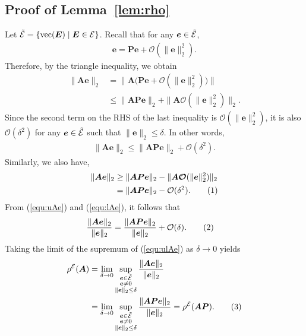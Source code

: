 \documentclass{article}
\def\E{{\cal E}}
\newcommand{\norm}[1]{\|#1\|} %
\newcommand\numberthis{\addtocounter{equation}{1}\tag{\theequation}}
\DeclareMathOperator*{\vect}{vec}
\begin{document}
\subsection{Proof of Lemma~\ref{lem:rho}}
Let $\tilde{\E} = \{ \vect(\bm E) \mid \bm E \in \E \}$.
Recall that for any $\bm e \in \tilde{\E}$,
\begin{align*}
    \bm e = \bm P \bm e + \bm{\mathcal{O}}(\norm{\bm e}_2^2) .
\end{align*}
Therefore, by the triangle inequality, we obtain
\begin{align*}
    \norm{\bm A \bm e}_2 &= \norm{\bm A \bigl(\bm P \bm e + \bm{\mathcal{O}}(\norm{\bm e}_2^2) \bigr)} \\
    &\leq \norm{\bm A \bm P \bm e}_2 + \norm{\bm A \bm{\mathcal{O}}(\norm{\bm e}_2^2)}_2 .
\end{align*}
Since the second term on the RHS of the last inequality is $\mathcal{O}(\norm{\bm e}_2^2)$, it is also $\mathcal{O}(\delta^2)$ for any $\bm e \in \tilde{\E}$ such that $\norm{\bm e}_2 \leq \delta$. In other words,
\begin{align} \label{equ:uAe}
    \norm{\bm A \bm e}_2 \leq \norm{\bm A \bm P \bm e}_2 + \mathcal{O}(\delta^2) .
\end{align}
Similarly, we also have,
\begin{align*} 
    \norm{\bm A \bm e}_2 &\geq \norm{\bm A \bm P \bm e}_2 - \norm{\bm A \bm{\mathcal{O}}(\norm{\bm e}_2^2)}_2 \\
    &= \norm{\bm A \bm P \bm e}_2 - \mathcal{O}(\delta^2) . \numberthis \label{equ:lAe}
\end{align*}
From (\ref{equ:uAe}) and (\ref{equ:lAe}), it follows that
\begin{align*} 
    \frac{\norm{\bm A \bm e}_2}{\norm{\bm e}_2} &= \frac{\norm{\bm A \bm P \bm e}_2}{\norm{\bm e}_2} + \mathcal{O}(\delta) . \numberthis \label{equ:ulAe}
\end{align*}
Taking the limit of the supremum of (\ref{equ:ulAe}) as $\delta \to 0$ yields
\begin{align*}
    \rho^\E(\bm A) &= \lim_{\delta \to 0} \sup_{\substack{\bm e \in \tilde{\E} \\ \bm e \neq 0 \\ \norm{\bm e}_2 \leq \delta}} \frac{\norm{\bm A \bm e}_2}{\norm{\bm e}_2} \\
    &= \lim_{\delta \to 0} \sup_{\substack{\bm e \in \tilde{\E} \\ \bm e \neq 0 \\ \norm{\bm e}_2 \leq \delta}} \frac{\norm{\bm A \bm P \bm e}_2}{\norm{\bm e}_2} = \rho^\E(\bm A \bm P) . \numberthis \label{equ:A_AP}
\end{align*}
\end{document}
